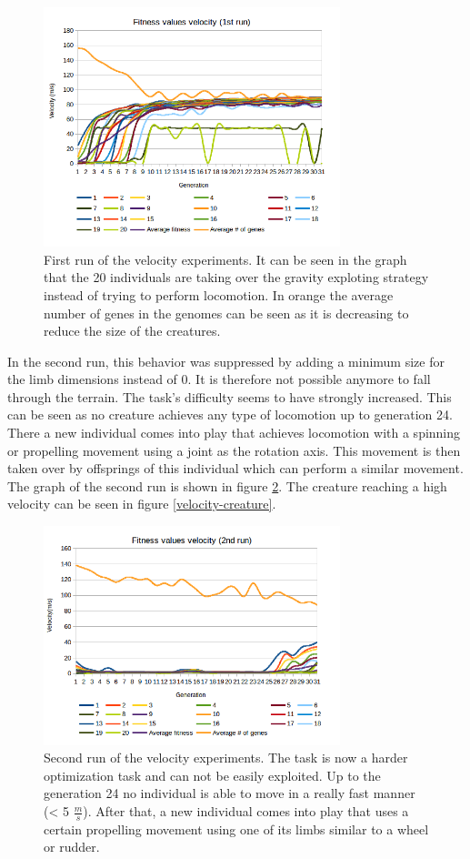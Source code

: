 \documentclass[letterpaper, 10 pt, conference]{ieeeconf}  %
\begin{document}
\begin{figure}[tp]
    \centering
    \includegraphics[width=3.4in, clip] {figs/velocity1.png}
    \caption{First run of the velocity experiments. It can be seen in the graph that the 20 individuals are taking over the gravity exploting strategy instead of trying to perform locomotion. In orange the average number of genes in the genomes can be seen as it is decreasing to reduce the size of the creatures.}
    \label{velocity1}
\end{figure}

In the second run, this behavior was suppressed by adding a minimum size for the limb dimensions instead of 0. It is therefore not possible anymore to fall through the terrain. The task's difficulty seems to have strongly increased. This can be seen as no creature achieves any type of locomotion up to generation 24. There a new individual comes into play that achieves locomotion with a spinning or propelling movement using a joint as the rotation axis. This movement is then taken over by offsprings of this individual which can perform a similar movement. The graph of the second run is shown in figure \ref{velocity2}. The creature reaching a high velocity can be seen in figure \ref{velocity-creature}.

\begin{figure}[tp]
    \centering
    \includegraphics[width=3.4in, clip] {figs/velocity2.png}
    \caption{Second run of the velocity experiments. The task is now a harder optimization task and can not be easily exploited. Up to the generation 24 no individual is able to move in a really fast manner (< 5 $\frac{m}{s}$). After that, a new individual comes into play that uses a certain propelling movement using one of its limbs similar to a wheel or rudder.}
    \label{velocity2}
\end{figure}
\end{document}
